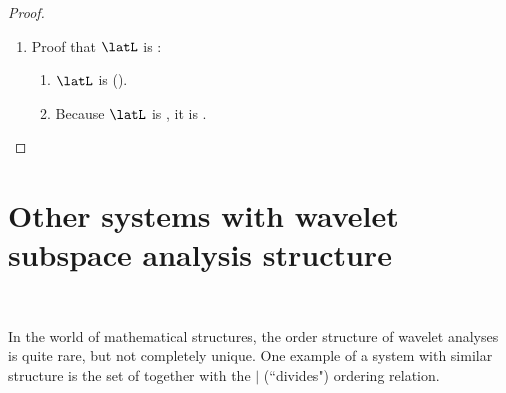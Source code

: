 \begin{proof}
\begin{enumerate}

  \item Proof that $\latL$ is :
    \begin{enumerate}
      \item $\latL$ is  ().
      \item Because $\latL$ is , it is .
    \end{enumerate}
\end{enumerate}
\end{proof}


\section{Other systems with wavelet subspace analysis structure}
\mbox{}\\
\begin{minipage}{\tw-65mm}%
  In the world of mathematical structures,
  the order structure of wavelet analyses is quite rare, but not completely unique.
  One example of a system with similar structure is the set of 
  together with the $|$ (``divides") ordering relation.\footnotemark
\end{minipage}%
%
\hfill%
{\begin{minipage}{60mm}%
\end{minipage}}%


